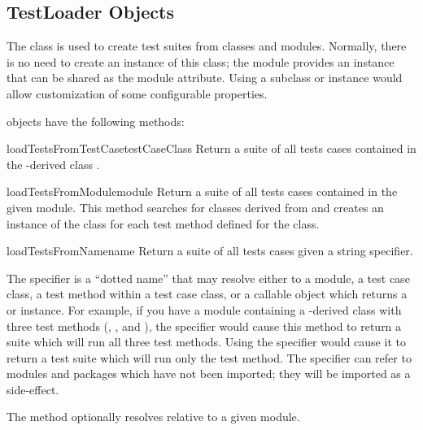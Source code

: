 \subsection{TestLoader Objects
            \label{testloader-objects}}

The  class is used to create test suites from
classes and modules.  Normally, there is no need to create an instance
of this class; the  module provides an instance
that can be shared as the  module attribute.
Using a subclass or instance would allow customization of some
configurable properties.

 objects have the following methods:

\begin{methoddesc}[TestLoader]{loadTestsFromTestCase}{testCaseClass}
  Return a suite of all tests cases contained in the
  -derived class .
\end{methoddesc}

\begin{methoddesc}[TestLoader]{loadTestsFromModule}{module}
  Return a suite of all tests cases contained in the given module.
  This method searches  for classes derived from
   and creates an instance of the class for each test
  method defined for the class.

\end{methoddesc}

\begin{methoddesc}[TestLoader]{loadTestsFromName}{name}
  Return a suite of all tests cases given a string specifier.

  The specifier  is a ``dotted name'' that may resolve
  either to a module, a test case class, a test method within a test
  case class, or a callable object which returns a  or
   instance.  For example, if you have a module
   containing a -derived class
   with three test methods (,
  , and ), the specifier
   would cause this method to
  return a suite which will run all three test methods.  Using the
  specifier  would cause
  it to return a test suite which will run only the
   test method.  The specifier can refer to modules
  and packages which have not been imported; they will be imported as
  a side-effect.

  The method optionally resolves  relative to a given module.
\end{methoddesc}

